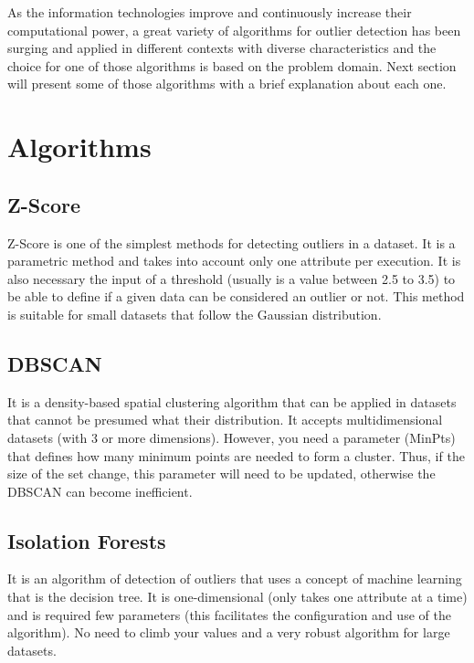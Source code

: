 As the information technologies improve and continuously increase their computational power, a great variety of algorithms for outlier detection has been surging and applied in different contexts with diverse characteristics and the choice for one of those algorithms is based on the problem domain. Next section will present some of those algorithms with a brief explanation about each one.


\section{Algorithms}

\subsection{Z-Score}

Z-Score is one of the simplest methods for detecting outliers in a dataset. It is a
parametric method and takes into account only one attribute per execution. It is also
necessary the input of a threshold (usually is a value between 2.5 to 3.5) to be able
to define if a given data can be considered an outlier or not. This method is suitable
for small datasets that follow the Gaussian distribution.

\subsection{DBSCAN}

It is a density-based spatial clustering algorithm that can be applied in datasets that
cannot be presumed what their distribution. It accepts multidimensional datasets (with
3 or more dimensions). However, you need a parameter (MinPts) that defines how many
minimum points are needed to form a cluster. Thus, if the size of the set change, this
parameter will need to be updated, otherwise the DBSCAN can become inefficient.

\subsection{Isolation Forests}

It is an algorithm of detection of outliers that uses a concept of machine learning that
is the decision tree. It is one-dimensional (only takes one attribute at a time) and is
required few parameters (this facilitates the configuration and use of the algorithm).
No need to climb your values and a very robust algorithm for large datasets.

